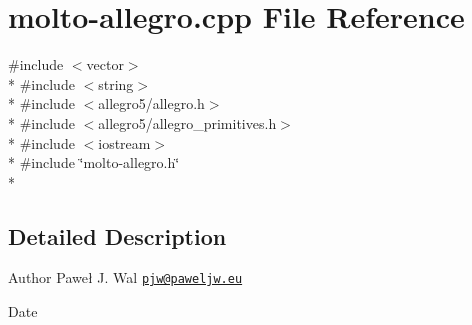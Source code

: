\hypertarget{molto-allegro_8cpp}{\section{molto-\/allegro.cpp File Reference}
\label{molto-allegro_8cpp}
}
{\ttfamily \#include $<$vector$>$}\\*
{\ttfamily \#include $<$string$>$}\\*
{\ttfamily \#include $<$allegro5/allegro.\-h$>$}\\*
{\ttfamily \#include $<$allegro5/allegro\-\_\-primitives.\-h$>$}\\*
{\ttfamily \#include $<$iostream$>$}\\*
{\ttfamily \#include \char`\"{}molto-\/allegro.\-h\char`\"{}}\\*


\subsection{Detailed Description}
\begin{DoxyAuthor}{Author}
Paweł J. Wal \href{mailto:pjw@paweljw.eu}{\tt pjw@paweljw.\-eu} 
\end{DoxyAuthor}
\begin{DoxyDate}{Date}

\end{DoxyDate}
